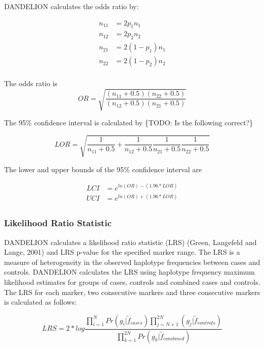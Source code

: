DANDELION calculates the odds ratio by:

\begin{align*}
  n_{11} &= 2p_1n_1 \\
  n_{12} &= 2p_2n_2 \\
  n_{21} &= 2(1-p_1)n_1 \\
  n_{22} &= 2(1-p_2)n_2 \\
\end{align*}

The odds ratio is
\begin{equation*}
  OR = \sqrt{\frac{(n_{11}+0.5)(n_{22}+0.5)}{(n_{12}+0.5)(n_{21}+0.5)}}
\end{equation*}

The 95\% confidence interval is calculated by \{TODO: Is the following
correct?\}

\begin{equation*}
  LOR = \sqrt{\frac{1}{n_{11}+0.5}+\frac{1}{n_{12}+0.5}\frac{1}{n_{21}+0.5}\frac{1}{n_{22}+0.5}}
\end{equation*}

The lower and upper bounds of the 95\% confidence interval are

\begin{align*}
  LCI &= e^{ln(OR)-(1.96*LOR)} \\
  UCI &= e^{ln(OR)+(1.96*LOR)} \\
\end{align*}

\subsubsection{Likelihood Ratio Statistic}
\label{subsub:lrs}
DANDELION calculates a likelihood ratio statistic (LRS) (Green, Langefeld and
Lange, 2001) and LRS p-value for the specified marker range.  The LRS is a
measure of heterogeneity in the observed haplotype frequencies between cases and
controls.  DANDELION calculates the LRS using haplotype frequency maximum
likelihood estimates for groups of cases, controls and combined cases and
controls.  The LRS for each marker, two consecutive markers and three
consecutive markers is calculated as follows:

\begin{equation*} %
  LRS = 2*log\frac{\displaystyle\prod_{i=1}^N Pr(g_i|\tilde{f}_{cases}) \prod_{j=N+1}^{2N} (g_j|\tilde{f}_{controls}) }
                  {\displaystyle\prod_{k=1}^{2N}Pr(g_k|\tilde{f}_{combined})}
\end{equation*}

